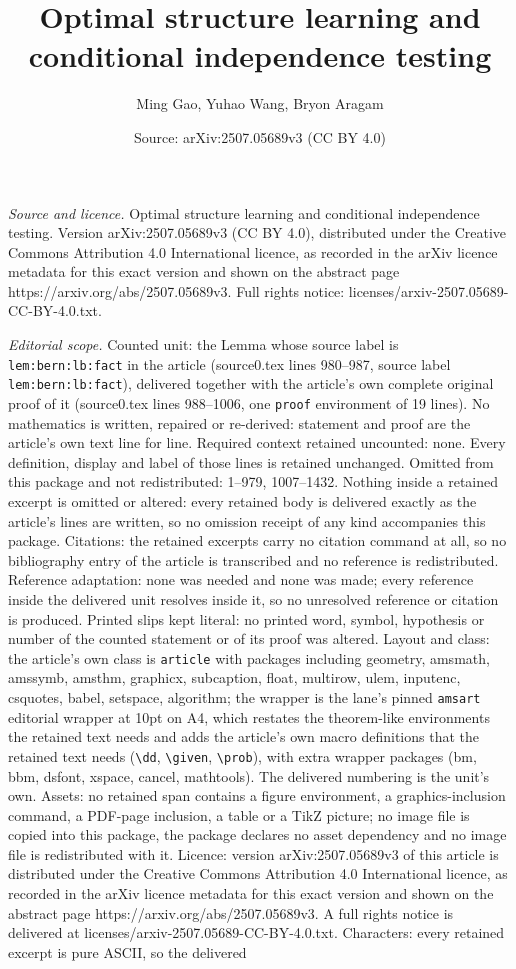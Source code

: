 \documentclass[10pt,a4paper]{amsart}
\title[Optimal structure learning and conditional independence test]{Optimal structure learning and conditional independence testing}
\author{Ming Gao, Yuhao Wang, Bryon Aragam}
\date{Source: arXiv:2507.05689v3 (CC BY 4.0)}
\begin{document}
\maketitle

\noindent\emph{Source and licence.} Optimal structure learning and conditional independence testing. Version arXiv:2507.05689v3 (CC BY 4.0), distributed under the Creative Commons Attribution 4.0 International licence, as recorded in the arXiv licence metadata for this exact version and shown on the abstract page https://arxiv.org/abs/2507.05689v3. Full rights notice: licenses/arxiv-2507.05689-CC-BY-4.0.txt.\par\smallskip

\noindent\textit{Editorial scope.} Counted unit: the Lemma whose source label is \texttt{lem:bern:lb:fact} in the article (source0.tex lines 980--987, source label \texttt{lem:bern:lb:fact}), delivered together with the article's own complete original proof of it (source0.tex lines 988--1006, one \texttt{proof} environment of 19 lines). No mathematics is written, repaired or re-derived: statement and proof are the article's own text line for line. Required context retained uncounted: none. Every definition, display and label of those lines is retained unchanged. Omitted from this package and not redistributed: 1--979, 1007--1432. Nothing inside a retained excerpt is omitted or altered: every retained body is delivered exactly as the article's lines are written, so no omission receipt of any kind accompanies this package. Citations: the retained excerpts carry no citation command at all, so no bibliography entry of the article is transcribed and no reference is redistributed. Reference adaptation: none was needed and none was made; every reference inside the delivered unit resolves inside it, so no unresolved reference or citation is produced. Printed slips kept literal: no printed word, symbol, hypothesis or number of the counted statement or of its proof was altered. Layout and class: the article's own class is \texttt{article} with packages including geometry, amsmath, amssymb, amsthm, graphicx, subcaption, float, multirow, ulem, inputenc, csquotes, babel, setspace, algorithm; the wrapper is the lane's pinned \texttt{amsart} editorial wrapper at 10pt on A4, which restates the theorem-like environments the retained text needs and adds the article's own macro definitions that the retained text needs (\texttt{\textbackslash dd}, \texttt{\textbackslash given}, \texttt{\textbackslash prob}), with extra wrapper packages (bm, bbm, dsfont, xspace, cancel, mathtools). The delivered numbering is the unit's own. Assets: no retained span contains a figure environment, a graphics-inclusion command, a PDF-page inclusion, a table or a TikZ picture; no image file is copied into this package, the package declares no asset dependency and no image file is redistributed with it. Licence: version arXiv:2507.05689v3 of this article is distributed under the Creative Commons Attribution 4.0 International licence, as recorded in the arXiv licence metadata for this exact version and shown on the abstract page https://arxiv.org/abs/2507.05689v3. A full rights notice is delivered at licenses/arxiv-2507.05689-CC-BY-4.0.txt. Characters: every retained excerpt is pure ASCII, so the delivered 
\end{document}
